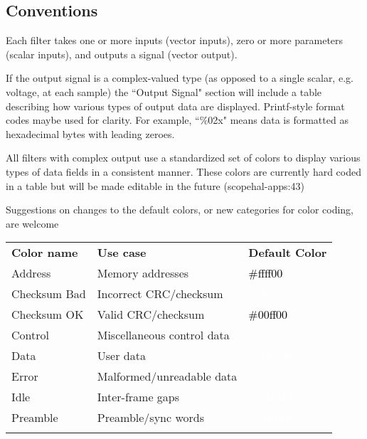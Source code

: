 \subsection{Conventions}

Each filter takes one or more inputs (vector inputs), zero or more parameters (scalar inputs), and outputs a
signal (vector output).

If the output signal is a complex-valued type (as opposed to a single scalar, e.g. voltage, at each sample) the
``Output Signal" section will include a table describing how various types of output data are displayed. Printf-style
format codes maybe used for clarity. For example, ``\%02x" means data is formatted as hexadecimal bytes with leading
zeroes.

All filters with complex output use a standardized set of colors to display various types of data fields in a
consistent manner. These colors are currently hard coded in a table but will be made editable in the future
(scopehal-apps:43)

Suggestions on changes to the default colors, or new categories for color coding, are welcome

\begin{tabularx}{16cm}{llX}
\thickhline
\textbf{Color name} & \textbf{Use case} & \textbf{Default Color} \\
\thickhline
Address & Memory addresses & \cellcolor{address}\textcolor{black}{\#ffff00} \\
\thickhline
Checksum Bad & Incorrect CRC/checksum & \cellcolor{checksumbad}\textcolor{white}{\#ff0000} \\
\thickhline
Checksum OK & Valid CRC/checksum & \cellcolor{checksumok}\textcolor{black}{\#00ff00} \\
\thickhline
Control & Miscellaneous control data & \cellcolor{control}\textcolor{white}{\#c000a0} \\
\thickhline
Data & User data & \cellcolor{data}\textcolor{white}{\#336699} \\
\thickhline
Error & Malformed/unreadable data & \cellcolor{error}\textcolor{white}{\#ff0000} \\
\thickhline
Idle & Inter-frame gaps & \cellcolor{idle}\textcolor{white}{\#404040} \\
\thickhline
Preamble & Preamble/sync words & \cellcolor{preamble}\textcolor{white}{\#808080} \\
\thickhline
\end{tabularx}

\pagebreak
